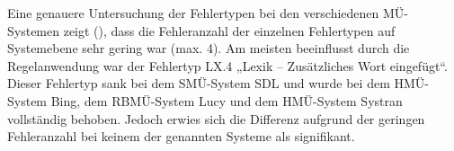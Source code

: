 
Eine genauere Untersuchung der Fehlertypen bei den verschiedenen MÜ-Syste\-men zeigt (), dass die Fehleranzahl der einzelnen Fehlertypen auf Systemebene sehr gering war (max. 4). Am meisten beeinflusst durch die Regelanwendung war der Fehlertyp LX.4 „Lexik -- Zusätzliches Wort eingefügt“. Dieser Fehlertyp sank bei dem SMÜ-System SDL und wurde bei dem HMÜ-System Bing, dem RBMÜ-System Lucy und dem HMÜ-System Systran vollständig behoben. Jedoch erwies sich die Differenz aufgrund der geringen Fehleranzahl bei keinem der genannten Systeme als signifikant.


\begin{figure}




\end{figure}
